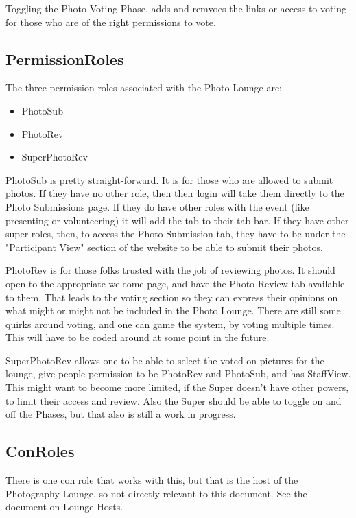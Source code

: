\documentclass[captions=tablesignature]{scrartcl}
\begin{document}
Toggling the Photo Voting Phase, adds and remvoes the links or
access to voting for those who are of the right permissions to
vote.

\subsection{PermissionRoles}
\label{sec-2-2}

The three permission roles associated with the Photo Lounge are:
\begin{itemize}
\item PhotoSub
\item PhotoRev
\item SuperPhotoRev
\end{itemize}

PhotoSub is pretty straight-forward.  It is for those who are
allowed to submit photos.  If they have no other role, then their
login will take them directly to the Photo Submissions page.  If
they do have other roles with the event (like presenting or
volunteering) it will add the tab to their tab bar.  If they have
other super-roles, then, to access the Photo Submission tab, they
have to be under the "Participant View" section of the website to
be able to submit their photos.

PhotoRev is for those folks trusted with the job of reviewing
photos.  It should open to the appropriate welcome page, and have
the Photo Review tab available to them.  That leads to the voting
section so they can express their opinions on what might or might
not be included in the Photo Lounge.  There are still some quirks
around voting, and one can game the system, by voting multiple
times.  This will have to be coded around at some point in the
future.

SuperPhotoRev allows one to be able to select the voted on pictures
for the lounge, give people permission to be PhotoRev and PhotoSub,
and has StaffView.  This might want to become more limited, if the
Super doesn't have other powers, to limit their access and review.
Also the Super should be able to toggle on and off the Phases, but
that also is still a work in progress.

\subsection{ConRoles}
\label{sec-2-3}

There is one con role that works with this, but that is the host of
the Photography Lounge, so not directly relevant to this document.
See the document on Lounge Hosts.
\end{document}
